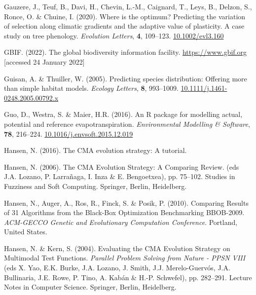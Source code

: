 \documentclass[11pt,]{article}
\newlength{\cslhangindent}
\newenvironment{CSLReferences}[2] %
 {%
  \setlength{\parindent}{0pt}
  \ifodd #1 \everypar{\setlength{\hangindent}{\cslhangindent}}\ignorespaces\fi
  \ifnum #2 > 0
  \setlength{\parskip}{#2\baselineskip}
  \fi
 }%
 {}
\begin{document}
\begin{CSLReferences}{1}{0}
\leavevmode{}%
Gauzere, J., Teuf, B., Davi, H., Chevin, L.-M., Caignard, T., Leys, B.,
Delzon, S., Ronce, O. \& Chuine, I. (2020). Where is the optimum?
{Predicting} the variation of selection along climatic gradients and the
adaptive value of plasticity. {A} case study on tree phenology.
\emph{Evolution Letters}, \textbf{4}, 109--123.
\href{https://doi.org/10.1002/evl3.160}{10.1002/evl3.160}

\leavevmode{}%
GBIF. (2022). The global biodiversity information facility.
\url{https://www.gbif.org} {[}accessed 24 January 2022{]}

\leavevmode{}%
Guisan, A. \& Thuiller, W. (2005). Predicting species distribution:
Offering more than simple habitat models. \emph{Ecology Letters},
\textbf{8}, 993--1009.
\href{https://doi.org/10.1111/j.1461-0248.2005.00792.x}{10.1111/j.1461-0248.2005.00792.x}

\leavevmode{}%
Guo, D., Westra, S. \& Maier, H.R. (2016). An {R} package for modelling
actual, potential and reference evapotranspiration. \emph{Environmental
Modelling \& Software}, \textbf{78}, 216--224.
\href{https://doi.org/10.1016/j.envsoft.2015.12.019}{10.1016/j.envsoft.2015.12.019}

\leavevmode{}%
Hansen, N. (2016). The CMA evolution strategy: A tutorial.

\leavevmode{}%
Hansen, N. (2006). The {CMA} {Evolution} {Strategy}: {A} {Comparing}
{Review}. (eds J.A. Lozano, P. Larrañaga, I. Inza \& E. Bengoetxea), pp.
75--102. Studies in {Fuzziness} and {Soft} {Computing}. Springer,
Berlin, Heidelberg.

\leavevmode{}%
Hansen, N., Auger, A., Ros, R., Finck, S. \& Posik, P. (2010).
{Comparing Results of 31 Algorithms from the Black-Box Optimization
Benchmarking BBOB-2009}. \emph{{ACM-GECCO Genetic and Evolutionary
Computation Conference}}. Portland, United States.

\leavevmode{}%
Hansen, N. \& Kern, S. (2004). Evaluating the {CMA} {Evolution}
{Strategy} on {Multimodal} {Test} {Functions}. \emph{Parallel {Problem}
{Solving} from {Nature} - {PPSN} {VIII}} (eds X. Yao, E.K. Burke, J.A.
Lozano, J. Smith, J.J. Merelo-Guervós, J.A. Bullinaria, J.E. Rowe, P.
Tino, A. Kabán \& H.-P. Schwefel), pp. 282--291. Lecture {Notes} in
{Computer} {Science}. Springer, Berlin, Heidelberg.


\end{CSLReferences}
\end{document}
